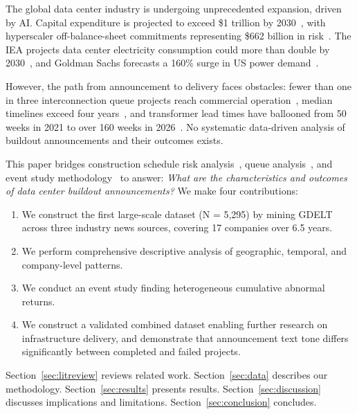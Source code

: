 \documentclass[5p,12pt]{elsarticle}
\begin{document}
The global data center industry is undergoing unprecedented expansion, driven by AI. Capital expenditure is projected to exceed \$1 trillion by 2030~\cite{Bain2025GlobalForecast}, with hyperscaler off-balance-sheet commitments representing \$662 billion in risk~\cite{Moodys2025Outlook,Lichtenberg2026OffBalance}. The IEA projects data center electricity consumption could more than double by 2030~\cite{IEA2025EnergyAI}, and Goldman Sachs forecasts a 160\% surge in US power demand~\cite{GoldmanSachs2024PowerDemand}.

However, the path from announcement to delivery faces obstacles: fewer than one in three interconnection queue projects reach commercial operation~\cite{Rand2025QueuedUp}, median timelines exceed four years~\cite{Johnston2023Empirical}, and transformer lead times have ballooned from 50 weeks in 2021 to over 160 weeks in 2026~\cite{DCKnowlege2026Delays,NERC2026Interconnection}. No systematic data-driven analysis of buildout announcements and their outcomes exists.

This paper bridges construction schedule risk analysis~\cite{Fitzsimmons2022Construction,Mosca2026AI}, queue analysis~\cite{Johnston2023Empirical,Rand2025QueuedUp}, and event study methodology~\cite{MacKinlay1997Event} to answer: \emph{What are the characteristics and outcomes of data center buildout announcements?} We make four contributions:

\begin{enumerate}
  \item We construct the first large-scale dataset (N = 5,295) by mining GDELT across three industry news sources, covering 17 companies over 6.5 years.
  \item We perform comprehensive descriptive analysis of geographic, temporal, and company-level patterns.
  \item We conduct an event study finding heterogeneous cumulative abnormal returns.
  \item We construct a validated combined dataset enabling further research on infrastructure delivery, and demonstrate that announcement text tone differs significantly between completed and failed projects.
\end{enumerate}

Section~\ref{sec:litreview} reviews related work. Section~\ref{sec:data} describes our methodology. Section~\ref{sec:results} presents results. Section~\ref{sec:discussion} discusses implications and limitations. Section~\ref{sec:conclusion} concludes.
\end{document}
